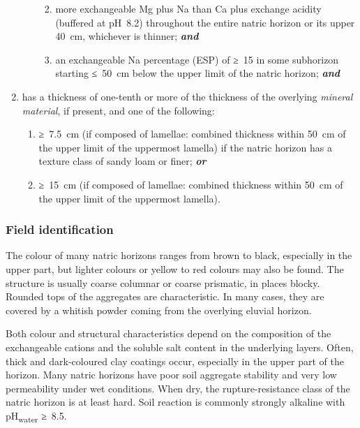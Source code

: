 \documentclass[
  letterpaper,
  DIV=11,
  numbers=noendperiod]{scrreprt}
\providecommand{\tightlist}{%
  \setlength{\itemsep}{0pt}\setlength{\parskip}{0pt}}\usepackage{longtable,booktabs,array}
\begin{document}
\begin{enumerate}
\begin{enumerate}
    \begin{enumerate}
    \def\labelenumiii{\roman{enumiii}.}
    \tightlist
    \item
      more exchangeable Mg plus Na than Ca plus exchange acidity
      (buffered at pH~8.2) throughout the entire natric horizon or its
      upper 40~cm, whichever is thinner; \textbf{\emph{and}}
    \item
      an exchangeable Na percentage (ESP) of ≥~15 in some subhorizon
      starting ≤~50~cm below the upper limit of the natric horizon;
      \textbf{\emph{and}}
    \end{enumerate}
  \end{enumerate}
\item
  has a thickness of one-tenth or more of the thickness of the overlying
  \emph{mineral material}, if present, and one of the following:

  \begin{enumerate}
  \def\labelenumii{\alph{enumii}.}
  \tightlist
  \item
    ≥~7.5~cm (if composed of lamellae: combined thickness within 50~cm
    of the upper limit of the uppermost lamella) if the natric horizon
    has a texture class of sandy loam or finer; \textbf{\emph{or}}
  \item
    ≥~15~cm (if composed of lamellae: combined thickness within 50~cm of
    the upper limit of the uppermost lamella).
  \end{enumerate}
\end{enumerate}

\hypertarget{field-identification-15}{%
\subsubsection{Field identification}\label{field-identification-15}}

The colour of many natric horizons ranges from brown to black,
especially in the upper part, but lighter colours or yellow to red
colours may also be found. The structure is usually coarse columnar or
coarse prismatic, in places blocky. Rounded tops of the aggregates are
characteristic. In many cases, they are covered by a whitish powder
coming from the overlying eluvial horizon.

Both colour and structural characteristics depend on the composition of
the exchangeable cations and the soluble salt content in the underlying
layers. Often, thick and dark-coloured clay coatings occur, especially
in the upper part of the horizon. Many natric horizons have poor soil
aggregate stability and very low permeability under wet conditions. When
dry, the rupture-resistance class of the natric horizon is at least
hard. Soil reaction is commonly strongly alkaline with
pH\textsubscript{water} ≥~8.5.
\end{document}
